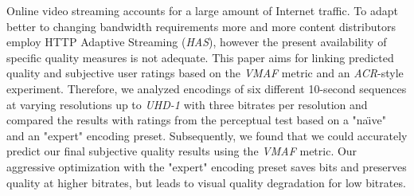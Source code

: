Online video streaming accounts for a large amount of Internet traffic. To adapt better to changing bandwidth requirements more and more content distributors employ HTTP Adaptive Streaming (\textit{HAS}), however the present availability of specific quality measures is not adequate. This paper aims for linking predicted quality and subjective user ratings based on the \textit{VMAF} metric and an \textit{ACR}-style experiment. Therefore, we analyzed encodings of six different 10-second sequences at varying resolutions up to \textit{UHD-1} with three bitrates per resolution and compared the results with ratings from the perceptual test based on a "na\"{\i}ve" and an "expert" encoding preset. Subsequently, we found that we could accurately predict our final subjective quality results using the \textit{VMAF} metric. Our aggressive optimization with the "expert" encoding preset saves bits and preserves quality at higher bitrates, but leads to visual quality degradation for low bitrates.